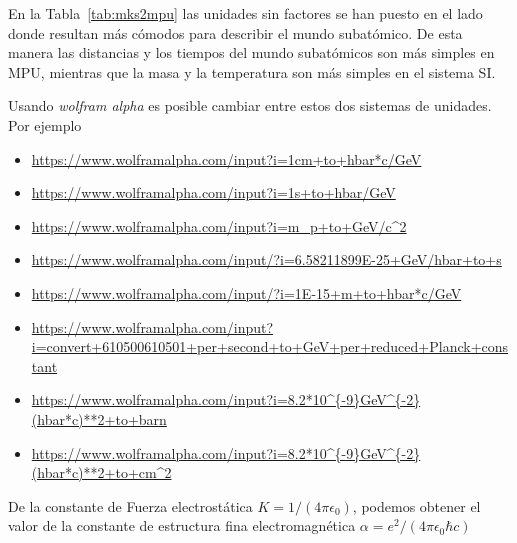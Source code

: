 \begin{frame}
En la Tabla~\ref{tab:mks2mpu} las unidades sin factores se han puesto en el lado donde resultan más cómodos para describir el mundo subatómico. De esta manera las distancias y los tiempos del mundo subatómicos son más simples en MPU, mientras que la masa y la temperatura son más simples en el sistema SI.




Usando \emph{wolfram alpha}  es posible cambiar entre estos dos sistemas de unidades. Por ejemplo

\begin{itemize}
\item \url{https://www.wolframalpha.com/input?i=1cm+to+hbar*c/GeV}
\item \url{https://www.wolframalpha.com/input?i=1s+to+hbar/GeV}
\item \url{https://www.wolframalpha.com/input?i=m_p+to+GeV/c^2}
\item \url{https://www.wolframalpha.com/input/?i=6.58211899E-25+GeV/hbar+to+s}
\item \url{https://www.wolframalpha.com/input/?i=1E-15+m+to+hbar*c/GeV}
\item \url{https://www.wolframalpha.com/input?i=convert+610500610501+per+second+to+GeV+per+reduced+Planck+constant}
\item \url{https://www.wolframalpha.com/input?i=8.2*10^{-9}GeV^{-2}(hbar*c)**2+to+barn}
\item \url{https://www.wolframalpha.com/input?i=8.2*10^{-9}GeV^{-2}(hbar*c)**2+to+cm^2}  
\end{itemize}

De la constante de Fuerza electrostática $K=1/(4\pi\epsilon_0)$, podemos obtener el valor de la constante de estructura fina electromagnética $\alpha=e^2/(4\pi\epsilon_0\hbar c)$


\end{frame}
